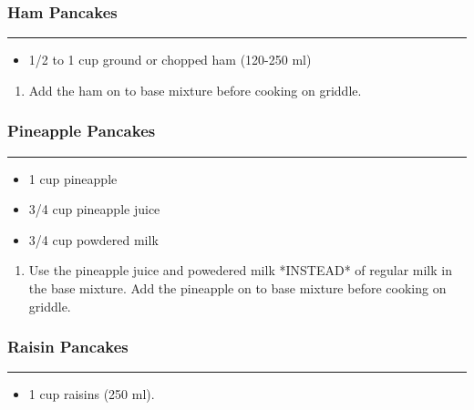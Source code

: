 \documentclass{article}
\begin{document}
\subsubsection{Ham Pancakes} 
\noindent\rule[0.5ex]{\linewidth}{0.5pt}

\begin{framed}
    \begin{itemize}
        \item 1/2 to 1 cup ground or chopped ham (120-250 ml)
    \end{itemize}
\end{framed}

\begin{enumerate}
    \item 
        Add the ham on to base mixture before cooking on griddle.
\end{enumerate}

\subsubsection{Pineapple Pancakes} 
\noindent\rule[0.5ex]{\linewidth}{0.5pt}

\begin{framed}
    \begin{itemize}
        \item 1 cup pineapple
        \item 3/4 cup pineapple juice
        \item 3/4 cup powdered milk
    \end{itemize}
\end{framed}

\begin{enumerate}
    \item 
        Use the pineapple juice and powedered milk *INSTEAD* of regular milk in the base mixture. Add the pineapple on to base mixture before cooking on griddle.
\end{enumerate}

\subsubsection{Raisin Pancakes} 
\noindent\rule[0.5ex]{\linewidth}{0.5pt}

\begin{framed}
    \begin{itemize}
        \item 1 cup raisins (250 ml). 
    \end{itemize}
\end{framed}
\end{document}
